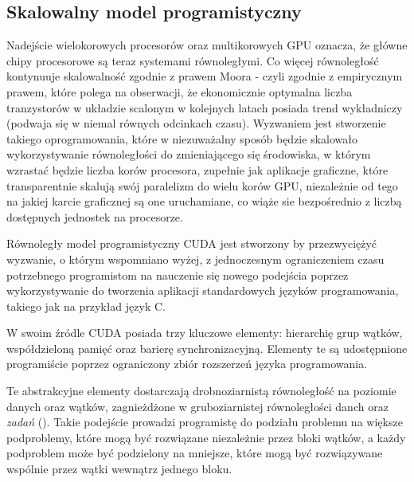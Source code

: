 \subsection{Skalowalny model programistyczny}
Nadejście wielokorowych procesorów oraz multikorowych GPU oznacza, że główne chipy procesorowe są teraz systemami równoległymi. Co więcej równoległość kontynuuje skalowalność zgodnie z prawem Moora - czyli zgodnie z empirycznym prawem, które polega na obserwacji, że ekonomicznie optymalna liczba tranzystorów w układzie scalonym w kolejnych latach posiada trend wykładniczy (podwaja się w niemal równych odcinkach czasu). Wyzwaniem jest stworzenie takiego oprogramowania, które w niezuważalny sposób będzie skalowało wykorzystywanie równoległości do zmieniającego się środowiska, w którym wzrastać będzie liczba korów procesora, zupełnie jak aplikacje graficzne, które transparentnie skalują swój paralelizm do wielu korów GPU, niezależnie od tego na jakiej karcie graficznej są one uruchamiane, co wiąże sie bezpośrednio z liczbą dostępnych jednostek na procesorze.

Równoległy model programistyczny CUDA jest stworzony by przezwyciężyć wyzwanie, o którym wspomniano wyżej, z jednoczesnym ograniczeniem czasu potrzebnego programistom na nauczenie się nowego podejścia poprzez wykorzystywanie do tworzenia aplikacji standardowych języków programowania, takiego jak na przykład język C.

W swoim źródle CUDA posiada trzy kluczowe elementy: hierarchię grup wątków, współdzieloną pamięć oraz barierę synchronizacyjną. Elementy te są udostępnione programiście poprzez ograniczony zbiór rozszerzeń języka programowania.

Te abstrakcyjne elementy dostarczają drobnoziarnistą równoległość na poziomie danych oraz wątków, zagnieżdżone w gruboziarnistej równoległości danch oraz \emph{zadań} (). Takie podejście prowadzi programistę do podziału problemu na większe podproblemy, które mogą być rozwiązane niezależnie przez bloki wątków, a każdy podproblem może być podzielony na mniejsze, które mogą być rozwiązywane wspólnie przez wątki wewnątrz jednego bloku.

